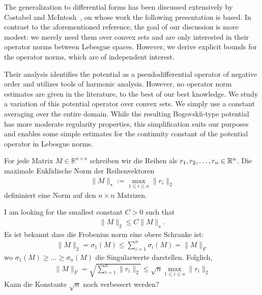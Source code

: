 \documentclass[10pt,a4paper]{article}
\begin{document}
    The generalization to differential forms has been discussed extensively by Costabel and McIntosh~\cite{costabel2010bogovskiui},
    on whose work the following presentation is based. 
    In contrast to the aforementioned reference, the goal of our discussion is more modest:
    we merely need them over convex sets and are only interested in their operator norms between Lebesgue spaces.
    However, we derive explicit bounds for the operator norms, which are of independent interest. 

    
    Their analysis identifies the potential as a pseudodifferential operator of negative order and utilizes tools of harmonic analysis. However, no operator norm estimates are given in the literature, to the best of our best knowledge.
    We study a variation of this potential operator over convex sets.
    We simply use a constant averaging over the entire domain. 
    While the resulting Bogovski\u{\i}-type potential has more moderate regularity properties, 
    this simplification suits our purposes and enables some simple estimates for the continuity constant of the potential operator in Lebesgue norms. 


For jede Matrix $M \in \mathbb R^{n \times n}$ schreiben wir die Reihen als $r_1, r_2, \dots, r_n \in {\mathbb R}^{n}$.
Die maximale Euklidische Norm der Reihenvektoren
\begin{align*}
    \| M \|_{\star} := \max\limits_{1 \leq i \leq n} \| r_i \|_{2}
\end{align*}
defininiert eine Norm auf den $n \times n$ Matrizen.

I am looking for the smallest constant $C > 0$ such that 
\begin{align*}
    \| M \|_{2} \leq C \| M \|_{\star}.
\end{align*}
Es ist bekannt dass die Frobenius norm eine obere Schranke ist:
\begin{align*}
    \| M \|_{2} = \sigma_{1}(M) \leq \sum_{i=1}^{n} \sigma_{i}(M) = \| M \|_{F}
\end{align*}
wo $\sigma_{1}(M) \geq \dots \geq \sigma_{n}(M)$ die Singularwerte darstellen. Folglich,
\begin{align*}
    \| M \|_{F} = \sqrt{\sum_{i=1}^{n} \| r_i \|_{2} } \leq \sqrt{n} \max\limits_{1 \leq i \leq n} \| r_i \|_{2}
\end{align*}
Kann die Konstante $\sqrt{n}$ noch verbessert werden?
\end{document}
